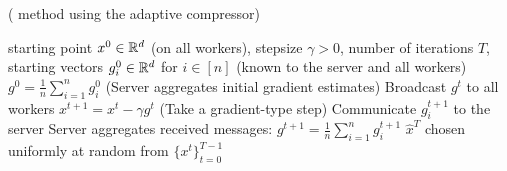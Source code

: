 \documentclass[nohyperref]{article}
\theoremstyle{plain}
\theoremstyle{definition}
\theoremstyle{remark}
\begin{document}
\begin{algorithm*}[!h]
   \caption{ ( method using the adaptive  compressor)}\label{alg:3PC}
\begin{algorithmic}[1]
    starting point $x^0\in \mathbb R^d$ (on all workers), stepsize $\gamma>0$, number of iterations $T$, starting vectors $g_i^0\in \mathbb R^d$ for $i \in [n]$ (known to the server and all workers)
     $g^0 = \frac{1}{n}\sum_{i=1}^n g_i^0$ \hfill (Server aggregates initial gradient estimates)
   \STATE Broadcast $g^t$ to all workers      
   \STATE $x^{t+1} = x^t - \gamma g^t$ \hfill (Take a gradient-type step)
   \STATE Communicate $g_i^{t+1}$ to the server    
   \ENDFOR
   \STATE Server aggregates received messages: $g^{t+1} = \tfrac{1}{n}\sum_{i=1}^n g_i^{t+1} $ 
   \ENDFOR
    $\hat x^T$ chosen uniformly at random from $\{x^t\}_{t=0}^{T-1}$
\end{algorithmic}
\end{algorithm*}
\end{document}
